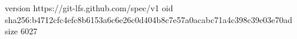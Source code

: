version https://git-lfs.github.com/spec/v1
oid sha256:b4712cfc4efc8b6153a6c6e26c0d404b8c7e57a0acabc71a4c398c39e03e70ad
size 6027
